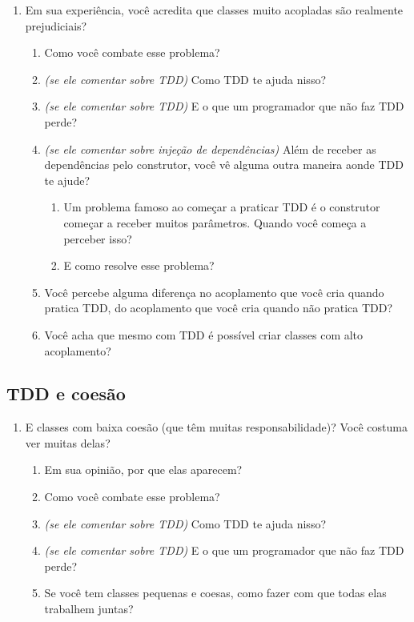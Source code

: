 \begin{enumerate}
	\item{Em sua experiência, você acredita que classes muito acopladas são realmente prejudiciais?}
		\begin{enumerate}
			\item Como você combate esse problema?

			\item \textit{(se ele comentar sobre TDD)} Como TDD te ajuda nisso?

			\item \textit{(se ele comentar sobre TDD)} E o que um programador que não faz
			TDD perde?
			
			\item \textit{(se ele comentar sobre injeção de dependências)} Além de
			receber as dependências pelo construtor, você vê alguma outra maneira aonde TDD te ajude?
				\begin{enumerate}
					\item Um problema famoso ao começar a praticar TDD é o construtor começar a
					receber muitos parâmetros. Quando você começa a perceber isso?
					\item E como resolve esse problema?
				\end{enumerate}

			\item Você percebe alguma diferença no acoplamento que você cria quando
			pratica TDD, do acoplamento que você cria quando não pratica TDD?

			\item Você acha que mesmo com TDD é possível criar classes com alto acoplamento? 
		\end{enumerate}
\end{enumerate}

\subsection{TDD e coesão}
\label{entrevista:coesao}

\begin{enumerate}
	\item{E classes com baixa coesão (que têm muitas responsabilidade)? Você
	costuma ver muitas delas?}
		\begin{enumerate}
			\item Em sua opinião, por que elas aparecem?

			\item Como você combate esse problema?

			\item \textit{(se ele comentar sobre TDD)} Como TDD te ajuda nisso?
			
			\item \textit{(se ele comentar sobre TDD)} E o que um programador que não faz TDD
			perde?

			\item Se você tem classes pequenas e coesas, como fazer com que todas elas
			trabalhem juntas?
		\end{enumerate}
\end{enumerate}

